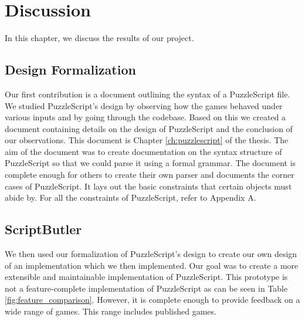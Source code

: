 \chapter{Discussion}
\label{ch:discussion}
In this chapter, we discuss the results of our project.

\section{Design Formalization}
Our first contribution is a document outlining the syntax of a PuzzleScript file. We studied PuzzleScript's design by observing how the games behaved under various inputs and by going through the codebase. Based on this we created a document containing details on the design of PuzzleScript and the conclusion of our observations. This document is Chapter \ref{ch:puzzlescript} of the thesis. The aim of the document was to create documentation on the syntax structure of PuzzleScript so that we could parse it using a formal grammar. The document is complete enough for others to create their own parser and documents the corner cases of PuzzleScript. It lays out the basic constraints that certain objects must abide by. For all the constraints of PuzzleScript, refer to Appendix A.

\section{ScriptButler}
We then used our formalization of PuzzleScript's design to create our own design of an implementation which we then implemented. Our goal was to create a more extensible and maintainable implementation of PuzzleScript. This prototype is not a feature-complete implementation of PuzzleScript as can be seen in Table \ref{fig:feature_comparison}. However, it is complete enough to provide feedback on a wide range of games. This range includes published games.


